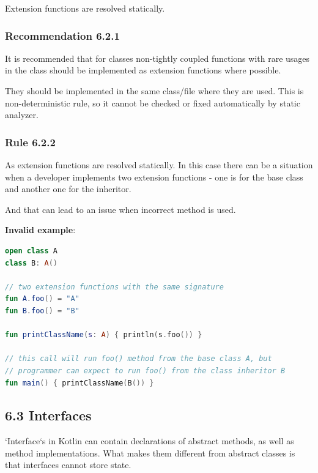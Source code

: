 {{{{Extension functions are resolved statically.



\subsubsection*{\textbf{Recommendation 6.2.1}}
\leavevmode\newline

It is recommended that for classes non-tightly coupled functions with rare usages in the class should be implemented as extension functions where possible.

They should be implemented in the same class/file where they are used. This is non-deterministic rule, so it cannot be checked or fixed automatically by static analyzer.



\subsubsection*{\textbf{Rule 6.2.2}}
\leavevmode\newline

As extension functions are resolved statically. In this case there can be a situation when a developer implements two extension functions - one is for the base class and another one for the inheritor.

And that can lead to an issue when incorrect method is used.



\textbf{Invalid example}:

\begin{lstlisting}[language=Kotlin]
open class A
class B: A()

// two extension functions with the same signature
fun A.foo() = "A"
fun B.foo() = "B"

fun printClassName(s: A) { println(s.foo()) }

// this call will run foo() method from the base class A, but
// programmer can expect to run foo() from the class inheritor B
fun main() { printClassName(B()) }
\end{lstlisting}


\subsection*{\textbf{6.3 Interfaces}}

`Interface`s in Kotlin can contain declarations of abstract methods, as well as method implementations. What makes them different from abstract classes is that interfaces cannot store state.

}}}}
